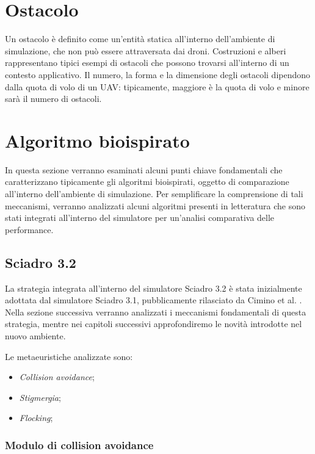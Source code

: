 \section{Ostacolo}

Un ostacolo è definito come un'entità statica all'interno dell'ambiente di simulazione, che non può essere attraversata dai droni.
Costruzioni e alberi rappresentano tipici esempi di ostacoli che possono trovarsi all'interno di un contesto applicativo.
Il numero, la forma e la dimensione degli ostacoli dipendono dalla quota di volo di un UAV: tipicamente, maggiore è la quota di volo e minore sarà il numero di ostacoli.

\section{Algoritmo bioispirato}

In questa sezione verranno esaminati alcuni punti chiave fondamentali che caratterizzano tipicamente gli algoritmi bioispirati, oggetto di comparazione all'interno dell'ambiente di simulazione.
Per semplificare la comprensione di tali meccanismi, verranno analizzati alcuni algoritmi presenti in letteratura che sono stati integrati all'interno del simulatore per un'analisi comparativa delle performance. 

\subsection{Sciadro 3.2}

La strategia integrata all'interno del simulatore Sciadro 3.2 è stata inizialmente adottata dal simulatore Sciadro 3.1, pubblicamente rilasciato da Cimino et al. \cite{cimino2019adaptive}.
Nella sezione successiva verranno analizzati i meccanismi fondamentali di questa strategia, mentre nei capitoli successivi approfondiremo le novità introdotte nel nuovo ambiente.

Le metaeuristiche analizzate sono:

\begin{itemize}
    \item \textit{Collision avoidance};
    \item \textit{Stigmergia};
    \item \textit{Flocking};
\end{itemize}

\subsubsection{Modulo di collision avoidance}


